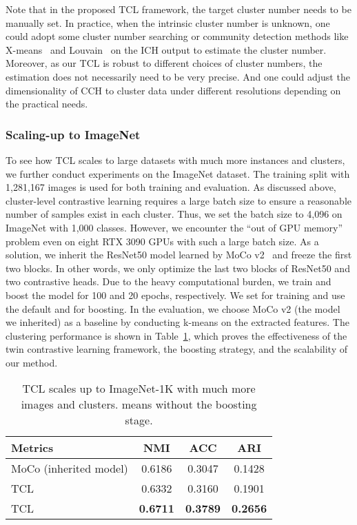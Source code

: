 Note that in the proposed TCL framework, the target cluster number needs to be manually set. In practice, when the intrinsic cluster number is unknown, one could adopt some cluster number searching or community detection methods like X-means~\citep{xmeans} and Louvain~\citep{louvain} on the ICH output to estimate the cluster number. Moreover, as our TCL is robust to different choices of cluster numbers, the estimation does not necessarily need to be very precise. And one could adjust the dimensionality of CCH to cluster data under different resolutions depending on the practical needs.

\subsubsection{Scaling-up to ImageNet}
To see how TCL scales to large datasets with much more instances and clusters, we further conduct experiments on the ImageNet dataset. The training split with 1,281,167 images is used for both training and evaluation. As discussed above, cluster-level contrastive learning requires a large batch size to ensure a reasonable number of samples exist in each cluster. Thus, we set the batch size to 4,096 on ImageNet with 1,000 classes. However, we encounter the ``out of GPU memory'' problem even on eight RTX 3090 GPUs with such a large batch size. As a solution, we inherit the ResNet50 model learned by MoCo v2~\cite{MOCOV2} and freeze the first two blocks. In other words, we only optimize the last two blocks of ResNet50 and two contrastive heads. Due to the heavy computational burden, we train and boost the model for 100 and 20 epochs, respectively. We set  for training and use the default  and  for boosting. In the evaluation, we choose MoCo v2 (the model we inherited) as a baseline by conducting k-means on the extracted features. The clustering performance is shown in Table~\ref{tab:ImageNet}, which proves the effectiveness of the twin contrastive learning framework, the boosting strategy, and the scalability of our method.

\begin{table}[h]
\centering
\caption{TCL scales up to ImageNet-1K with much more images and clusters. means without the boosting stage.}
\label{tab:ImageNet}
\begin{tabular}{@{}lccc@{}}
\toprule
Metrics               & NMI                  & ACC                  & ARI                  \\ \midrule
MoCo (inherited model)              &   0.6186                   &   0.3047                   &    0.1428                  \\
TCL       &        0.6332              &     0.3160                 &     0.1901                 \\
TCL                   & \textbf{0.6711} & \textbf{0.3789} & \textbf{0.2656} \\\bottomrule
\end{tabular}
\end{table}

